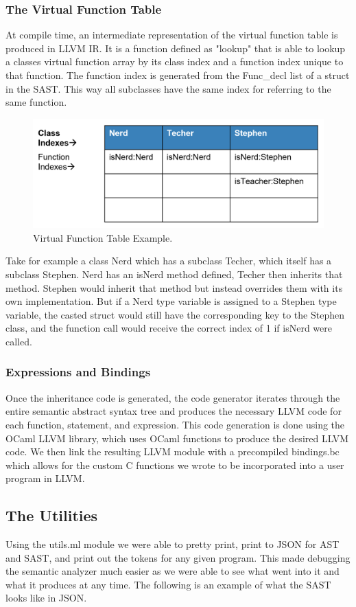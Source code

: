 \begin{homeworkProblem}
    \subsubsection{The Virtual Function Table}
	At compile time, an intermediate representation of the virtual function table is produced in LLVM IR. It is a function defined as "lookup" that is able to lookup a classes virtual function array by its class index and a function index unique to that function. The function index is generated from the Func\_decl list of a struct in the SAST. This way all subclasses have the same index for referring to the same function.
	\begin{figure}[!ht]
		\centering
		\includegraphics[width=4.5in]{Includes/vft}
		\caption{Virtual Function Table Example.}
	\end{figure}
	Take for example a class Nerd which has a subclass Techer, which itself has a subclass Stephen. Nerd has an isNerd method defined, Techer then inherits that method. Stephen would inherit that method but instead overrides them with its own implementation. But if a Nerd type variable is assigned to a Stephen type variable, the casted struct would still have the corresponding key to the Stephen class, and the function call would receive the correct index of 1 if isNerd were called. 
	\subsubsection{Expressions and Bindings}
	Once the inheritance code is generated, the code generator iterates through the entire semantic abstract syntax tree and produces the necessary LLVM code for each function, statement, and expression. This code generation is done using the OCaml LLVM library, which uses OCaml functions to produce the desired LLVM code.  We then link the resulting LLVM module with a precompiled bindings.bc which allows for the custom C functions we wrote to be incorporated into a user program in LLVM. 

	\subsection{The Utilities}
	Using the utils.ml module we were able to pretty print, print to JSON for AST and SAST, and print out the tokens for any given program. This made debugging the semantic analyzer much easier as we were able to see what went into it and what it produces at any time. The following is an example of what the SAST looks like in JSON.
	

\end{homeworkProblem}
